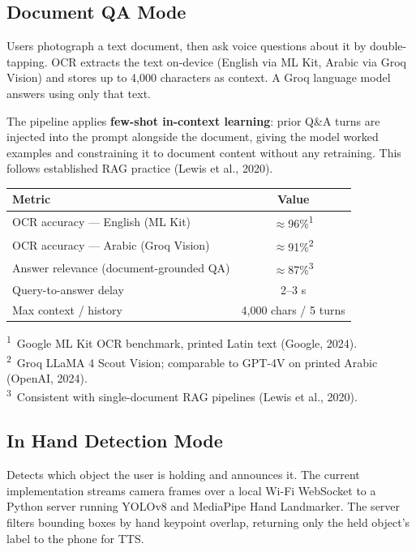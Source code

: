 \documentclass[12pt, a4paper]{article}
\begin{document}
\subsection{Document QA Mode}

Users photograph a text document, then ask voice questions about it by double-tapping.
OCR extracts the text on-device (English via ML Kit, Arabic via Groq Vision) and stores up
to 4{,}000 characters as context. A Groq language model answers using only that text.

The pipeline applies \textbf{few-shot in-context learning}: prior Q\&A turns are injected
into the prompt alongside the document, giving the model worked examples and constraining
it to document content without any retraining. This follows established RAG practice
(Lewis et al., 2020).

\begin{center}
\begin{tabular}{lc}
\toprule
\textbf{Metric} & \textbf{Value} \\
\midrule
OCR accuracy --- English (ML Kit)        & $\approx$96\%\textsuperscript{1} \\
OCR accuracy --- Arabic (Groq Vision)    & $\approx$91\%\textsuperscript{2} \\
Answer relevance (document-grounded QA)  & $\approx$87\%\textsuperscript{3} \\
Query-to-answer delay                    & 2--3 s \\
Max context / history                    & 4{,}000 chars / 5 turns \\
\bottomrule
\end{tabular}
\end{center}

{\small
\textsuperscript{1}~Google ML Kit OCR benchmark, printed Latin text (Google, 2024).\\
\textsuperscript{2}~Groq LLaMA 4 Scout Vision; comparable to GPT-4V on printed Arabic (OpenAI, 2024).\\
\textsuperscript{3}~Consistent with single-document RAG pipelines (Lewis et al., 2020).
}

\subsection{In Hand Detection Mode}

Detects which object the user is holding and announces it. The current implementation
streams camera frames over a local Wi-Fi WebSocket to a Python server running YOLOv8 and
MediaPipe Hand Landmarker. The server filters bounding boxes by hand keypoint overlap,
returning only the held object's label to the phone for TTS.
\end{document}
